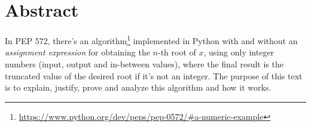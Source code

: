 \section*{Abstract}

In PEP 572, there's an algorithm\footnote{
  \url{https://www.python.org/dev/peps/pep-0572/\#a-numeric-example}
}
implemented in Python with and without an \emph{assignment expression}
for obtaining the $n$-th root of $x$,
using only integer numbers (input, output and in-between values),
where the final result is the truncated value of the desired root
if it's not an integer.
The purpose of this text is to explain, justify, prove and analyze
this algorithm and how it works.
